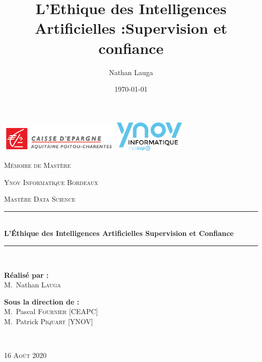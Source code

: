 \documentclass[10pt, french, a4paper]{report}
\title{L'Ethique des Intelligences Artificielles :\newline Supervision et confiance}
\author{Nathan Lauga}
\date{\today}
\begin{document}

\begin{titlepage}
  \begin{center}

    \includegraphics[height=1.3cm]{images/CEAPC_logo.png}
    \hspace{\fill}
    \includegraphics[height=1.5cm]{images/ynov_informatique_logo.png}

    \vspace{2.5cm}
    {\scshape\LARGE Mémoire de Mastère\par}
    \vspace{1cm}
    {\scshape\Large Ynov Informatique Bordeaux\par}
    \vspace{0.5cm}
    {\scshape\large Mastère Data Science\par}
    \vspace{1cm}
    
    \rule{\linewidth}{0.3mm} \\[0.4cm]
    { \huge \bfseries L'\uppercase{é}thique des Intelligences Artificielles \newline Supervision et Confiance \\[0.4cm] }
    \rule{\linewidth}{0.3mm} \\[1cm]
  
    \vspace{1.5cm}

    \noindent
    \begin{minipage}{0.4\textwidth}
      \begin{flushleft} \large
        \textbf{Réalisé par :}\\
        M.~Nathan \textsc{Lauga}\\
      \end{flushleft}
    \end{minipage}%
    \begin{minipage}{0.5\textwidth}
      \begin{flushright} \large
        \textbf{Sous la direction de :} \\
        M.~Pascal \textsc{Fournier} [CEAPC]\\
        M.~Patrick \textsc{Piquart} [YNOV]\\
      \end{flushright}
    \end{minipage}\\[1cm]

    \vspace{2.5cm}

    {\scshape\Large 16 Août 2020\par}
    
  \end{center}
\end{titlepage}
\end{document}
